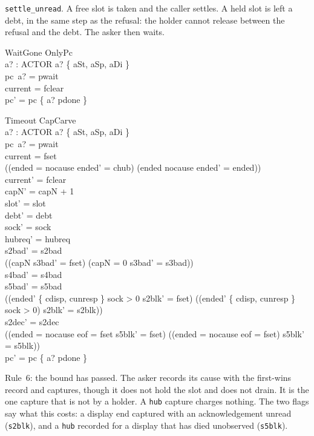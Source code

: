\documentclass[a4paper,10pt,fleqn]{article}
\begin{document}
\texttt{settle\_unread}.  A free slot is taken and the caller settles.  A held
slot is left a debt, in the same step as the refusal: the holder cannot release
between the refusal and the debt.  The asker then waits.

\begin{schema}{WaitGone}
  OnlyPc \\
  a? : ACTOR
\where
  a? \in \{ aSt, aSp, aDi \} \\
  pc~a? = pwait \\
  current = fclear \\
  pc' = pc \oplus \{ a? \mapsto pdone \}
\end{schema}

\begin{schema}{Timeout}
  CapCarve \\
  a? : ACTOR
\where
  a? \in \{ aSt, aSp, aDi \} \\
  pc~a? = pwait \\
  current = fset \\
  ((ended = nocause \land ended' = chub) \lor (ended \neq nocause \land ended' = ended)) \\
  current' = fclear \\
  capN' = capN + 1 \\
  slot' = slot \\
  debt' = debt \\
  sock' = sock \\
  hubreq' = hubreq \\
  s2bad' = s2bad \\
  ((capN  \land s3bad' = fset) \lor (capN = 0 \land s3bad' = s3bad)) \\
  s4bad' = s4bad \\
  s5bad' = s5bad \\
  ((ended' \in \{ cdisp, cunresp \} \land sock > 0 \land s2blk' = fset) \lor
    (\lnot (ended' \in \{ cdisp, cunresp \} \land sock > 0) \land s2blk' = s2blk)) \\
  s2dec' = s2dec \\
  ((ended = nocause \land eof = fset \land s5blk' = fset) \lor
    (\lnot (ended = nocause \land eof = fset) \land s5blk' = s5blk)) \\
  pc' = pc \oplus \{ a? \mapsto pdone \}
\end{schema}

Rule~6: the bound has passed.  The asker records its cause with the first-wins
record and captures, though it does not hold the slot and does not drain.  It is
the one capture that is not by a holder.  A \texttt{hub} capture charges nothing.
The two flags say what this costs: a display end captured with an
acknowledgement unread (\texttt{s2blk}), and a \texttt{hub} recorded for a
display that has died unobserved (\texttt{s5blk}).
\end{document}
